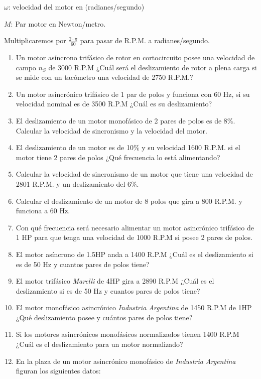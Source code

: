 \documentclass[../mainnull]{subfiles}
\begin{document}
$\omega$: velocidad del motor en (radianes/segundo)

$M$:  Par motor en Newton/metro.

Multiplicaremos por $\frac{2\cdot\pi}{60}$ para pasar de R.P.M. a
radianes/segundo.

\begin{enumerate}
  \item Un motor asíncrono trifásico de rotor en cortocircuito posee
    una velocidad de campo $n_S$ de 3000 R.P.M ¿Cuál será el
    deslizamiento de rotor a plena carga si se mide con un tacómetro
    una velocidad de 2750 R.P.M.?
  \item Un motor asincrónico trifásico de 1 par de polos y funciona
    con 60 Hz, si su velocidad nominal es de 3500 R.P.M ¿Cuál es su
    deslizamiento?
  \item El deslizamiento de un motor monofásico de 2 pares de polos
    es de 8\%. Calcular la velocidad de sincronismo y la velocidad del motor.
  \item El deslizamiento de un motor es de 10\% y su velocidad 1600
    R.P.M. si el motor tiene 2 pares de polos ¿Qué frecuencia lo está
    alimentando?
  \item Calcular la velocidad de sincronismo de un motor que tiene
    una velocidad de 2801 R.P.M. y un deslizamiento del 6\%.
  \item Calcular el deslizamiento de un motor de 8 polos que gira a
    800 R.P.M. y funciona a 60 Hz.
  \item Con qué frecuencia será necesario alimentar un motor
    asincrónico trifásico de 1 HP para que tenga una velocidad de
    1000 R.P.M si posee 2 pares de polos.
  \item El motor asíncrono de 1.5HP anda a 1400 R.P.M ¿Cuál es el
    deslizamiento si es de 50 Hz y cuantos pares de polos tiene?
  \item El motor trifásico \emph{Marelli} de 4HP gira a 2890 R.P.M
    ¿Cuál es el deslizamiento si es de 50 Hz y cuantos pares de polos tiene?
  \item El motor monofásico asincrónico \emph{Industria Argentina} de
    1450 R.P.M de 1HP ¿Qué deslizamiento posee y cuántos pares de polos tiene?
  \item Si los motores asincrónicos monofásicos normalizados tienen
    1400 R.P.M ¿Cuál es el deslizamiento para un motor normalizado?
  \item En la plaza de un motor asincrónico monofásico de
    \emph{Industria Argentina} figuran los siguientes datos:

\end{enumerate}
\end{document}
